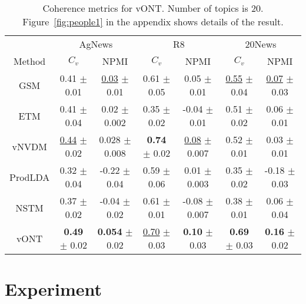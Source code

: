\documentclass[11pt]{article}
\begin{document}
\begin{table*}[ ]
\centering
\caption{Coherence metrics for vONT. Number of topics is 20. Figure~\ref{fig:people1} in the appendix shows details of the result.}
\vskip 0.15in
\scalebox{0.9} {
\centering
\begin{tabular}{| c| c c| c c| c c } 
\hline
\multicolumn{1}{c}{} \vline &
\multicolumn{2}{c}{AgNews}\vline  & \multicolumn{2}{c}{R8} \vline & \multicolumn{2}{c}{20News}\vline\\
\multicolumn{1}{c}{Method} \vline &
 \multicolumn{1}{c}{$C_{v}$} & \multicolumn{1}{c}{NPMI} \vline
& \multicolumn{1}{c}{$C_{v}$} & \multicolumn{1}{c}{NPMI} \vline
& \multicolumn{1}{c}{$C_{v}$} & \multicolumn{1}{c}{NPMI}\vline \\
\hline
\multicolumn{1}{c}{GSM} \vline & 0.41 $\pm$ 0.01 & \underline{0.03} $\pm$ 0.01 & 0.61 $\pm$ 0.05 & 0.05 $\pm$ 0.01  &  \underline{0.55} $\pm$ 0.04 & \underline{0.07} $\pm$ 0.03\\
\multicolumn{1}{c}{ETM} \vline & 0.41 $\pm$ 0.04 & 0.02 $\pm$ 0.002    & 0.35 $\pm$ 0.02 & -0.04 $\pm$ 0.01  & 0.51 $\pm$ 0.02 & 0.06 $\pm$ 0.01\\
\multicolumn{1}{c}{vNVDM} \vline  & \underline{0.44} $\pm$ 0.02 & 0.028 $\pm$ 0.008   & \textbf{0.74} $\pm$ 0.02 & \underline{0.08} $\pm$ 0.007 & 0.52 $\pm$ 0.01 & 0.03 $\pm$ 0.01\\
\multicolumn{1}{c}{ProdLDA} \vline  & 0.32 $\pm$ 0.04 & -0.22 $\pm$ 0.04   &  0.59 $\pm$ 0.06 & 0.01 $\pm$ 0.003 &  0.35 $\pm$ 0.02 & -0.18 $\pm$ 0.03\\
\multicolumn{1}{c}{NSTM} \vline &  0.37 $\pm$ 0.02  & -0.04 $\pm$ 0.02   & 0.61 $\pm$ 0.01 & -0.08 $\pm$ 0.007 &  0.38 $\pm$ 0.01 & 0.06 $\pm$ 0.04\\
\hline
\multicolumn{1}{c}{vONT} \vline &  \textbf{0.49} $\pm$ 0.02 & \textbf{0.054} $\pm$ 0.02   &  \underline{0.70} $\pm$ 0.03 & \textbf{0.10} $\pm$ 0.03 &  \textbf{0.69} $\pm$ 0.03 & \textbf{0.16} $\pm$ 0.02\\
\hline
\end{tabular}}

\label{table:2}
\end{table*}






\section{Experiment}
\end{document}
